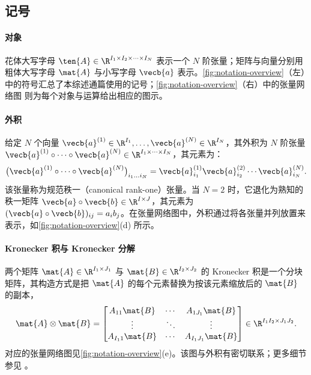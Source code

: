 \subsection{记号}

\paragraph{对象} 花体大写字母 $\ten{A}\in\R^{I_1\times I_2\times \cdots\times I_N}$ 表示一个 $N$ 阶张量；矩阵与向量分别用粗体大写字母 $\mat{A}$ 与小写字母 $\vecb{a}$ 表示。\cref{fig:notation-overview}（左）中的符号汇总了本综述通篇使用的记号；\cref{fig:notation-overview}（右）中的张量网络图 \cite{penrose1971tensordiagrams} 则为每个对象与运算给出相应的图示。


\paragraph{外积} 给定 $N$ 个向量 $\vecb{a}^{(1)}\in\R^{I_1},\ldots,\vecb{a}^{(N)}\in\R^{I_N}$，其外积为 $N$ 阶张量 $\vecb{a}^{(1)}\circ\cdots\circ\vecb{a}^{(N)}\in\R^{I_1\times\cdots\times I_N}$，其元素为：
\begin{equation}
\bigl(\vecb{a}^{(1)}\circ\cdots\circ\vecb{a}^{(N)}\bigr)_{i_1\ldots i_N}= \vecb{a}^{(1)}_{i_1}\vecb{a}^{(2)}_{i_2}\cdots \vecb{a}^{(N)}_{i_N}.
\end{equation}
该张量称为规范秩一（canonical rank-one）张量。当 $N=2$ 时，它退化为熟知的秩一矩阵 $\vecb{a}\circ\vecb{b}\in\R^{I\times J}$，其元素为 $(\vecb{a}\circ\vecb{b})_{ij}=a_ib_j$。在张量网络图中，外积通过将各张量并列放置来表示，如\cref{fig:notation-overview}(d) 所示。

\paragraph{Kronecker 积与 Kronecker 分解} 两个矩阵 $\mat{A}\in\R^{I_1\times J_1}$ 与 $\mat{B}\in\R^{I_2\times J_2}$ 的 Kronecker 积是一个分块矩阵，其构造方式是把 $\mat{A}$ 的每个元素替换为按该元素缩放后的 $\mat{B}$ 的副本，
\begin{equation}
  \mat{A}\otimes\mat{B}=
  \begin{bmatrix}
  A_{11}\mat{B} & \cdots & A_{1J_1}\mat{B} \\
  \vdots & \ddots & \vdots \\
  A_{I_11}\mat{B} & \cdots & A_{I_1J_1}\mat{B}
  \end{bmatrix}
  \in\R^{I_1I_2\times J_1J_2}.
\end{equation}
对应的张量网络图见\cref{fig:notation-overview}(e)。该图与外积有密切联系；更多细节参见 \cite{yokota2024tensorbasics}。

